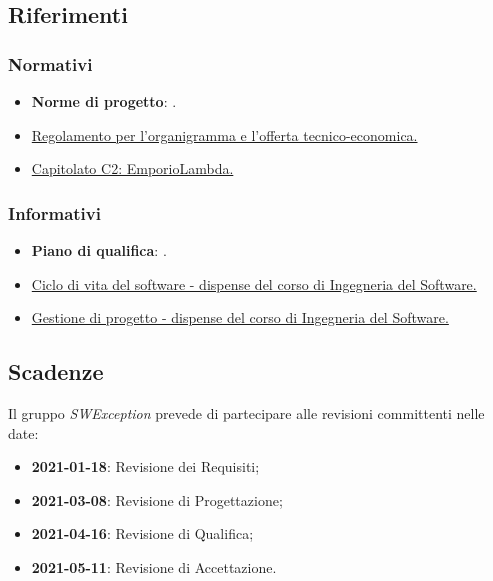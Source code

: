 \subsection{Riferimenti}

\subsubsection{Normativi}
\begin{itemize}
    \item \textbf{Norme di progetto}: .
    \item \href{https://www.math.unipd.it/~tullio/IS-1/2020/Progetto/RO.html}{Regolamento per l'organigramma e l'offerta tecnico-economica.}
    \item \href{https://www.math.unipd.it/~tullio/IS-1/2020/Progetto/C2.pdf}{Capitolato C2: EmporioLambda.}
\end{itemize}

\subsubsection{Informativi}
\begin{itemize}
    \item \textbf{Piano di qualifica}: .
    \item \href{https://www.math.unipd.it/~tullio/IS-1/2020/Dispense/L05.pdf}{Ciclo di vita del software - dispense del corso di Ingegneria del Software.}
    \item \href{https://www.math.unipd.it/~tullio/IS-1/2020/Dispense/L05.pdf}{Gestione di progetto - dispense del corso di Ingegneria del Software.}
\end{itemize}

\subsection{Scadenze}
Il gruppo \textit{SWException} prevede di partecipare alle revisioni committenti nelle date:
\begin{itemize}
    \item \textbf{2021-01-18}: Revisione dei Requisiti;
    \item \textbf{2021-03-08}: Revisione di Progettazione;
    \item \textbf{2021-04-16}: Revisione di Qualifica;
    \item \textbf{2021-05-11}: Revisione di Accettazione.
\end{itemize}